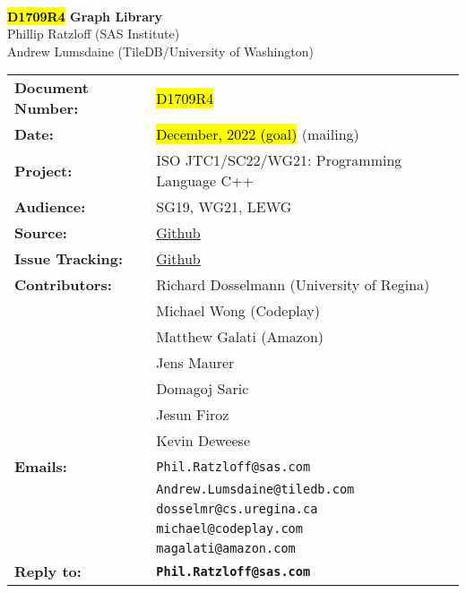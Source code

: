 \documentclass[10pt,onecolumn]{article}
\begin{document}
\begin{titlepage}
~
\vfill
\begin{center}
\LARGE
\textbf{\hl{D1709R4} Graph Library}\\
\vspace{12pt}
\normalsize
	Phillip Ratzloff (SAS Institute)\\
	Andrew Lumsdaine (TileDB/University of Washington)\\
\end{center}
\vspace{32pt}
\begin{tabular}{ll}
\textbf{Document Number:} & \hl{D1709R4} \\
\textbf{Date:} & \hl{December, 2022 (goal)} (mailing)\\ 
\textbf{Project:} & ISO JTC1/SC22/WG21: Programming Language C++\\
\textbf{Audience:} & SG19, WG21, LEWG\\
\textbf{Source:} & \href{https://github.com/stdgraph/graph-v2}{Github} \\
\textbf{Issue Tracking:} & \href{https://github.com/stdgraph/graph-v2/issues}{Github} \\
\textbf{Contributors:}
	&Richard Dosselmann (University of Regina)\\
	&Michael Wong (Codeplay)\\
	&Matthew Galati (Amazon)\\	
	&Jens Maurer\\
	&Domagoj Saric\\
	&Jesun Firoz\\
	&Kevin Deweese\\
\textbf{Emails:}
	&\texttt{Phil.Ratzloff@sas.com}\\
	&\texttt{Andrew.Lumsdaine@tiledb.com}\\
	&\texttt{dosselmr@cs.uregina.ca}\\
	&\texttt{michael@codeplay.com}\\
	&\texttt{magalati@amazon.com}\\
\textbf{Reply to:}
	&\texttt{\textbf{Phil.Ratzloff@sas.com}}\\
\end{tabular}
\vfill
~
\end{titlepage}

\tableofcontents

\clearpage













% 




\end{document}
